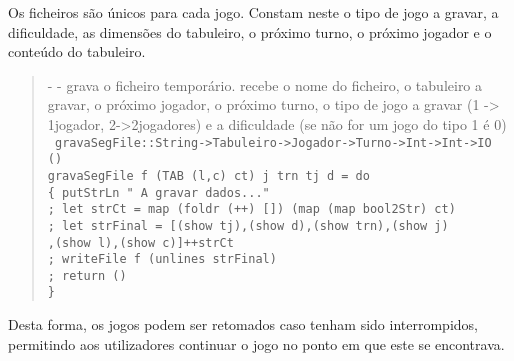 \documentclass[a4paper,titlepage]{scrreprt}
\begin{document}
Os ficheiros são únicos para cada jogo. Constam neste o tipo de jogo a gravar, a dificuldade, as dimensões do tabuleiro, o próximo turno, o próximo
jogador e o conteúdo do tabuleiro.
	\begin{quote}
		{\small - - grava o ficheiro temporário. recebe o nome do ficheiro, o tabuleiro a gravar, o próximo jogador, o próximo turno, o tipo de jogo a gravar (1 -> 1jogador, 2->2jogadores) e a dificuldade (se não for um jogo do tipo 1 é 0)\\}
		{\tt
		gravaSegFile::String->Tabuleiro->Jogador->Turno->Int->Int->IO ()\\
		gravaSegFile f (TAB (l,c) ct) j trn tj d = do\\
		\{ putStrLn " A gravar dados..."\\
		; let strCt = map (foldr (++) []) (map (map bool2Str) ct)\\
		; let strFinal = [(show tj),(show d),(show trn),(show j)\\
		,(show l),(show c)]++strCt\\
		; writeFile f (unlines strFinal)\\
		; return ()\\
		\}
		}
	\end{quote}
Desta forma, os jogos podem ser retomados caso tenham sido interrompidos, permitindo aos utilizadores continuar o jogo no ponto em que este se encontrava.
\end{document}
